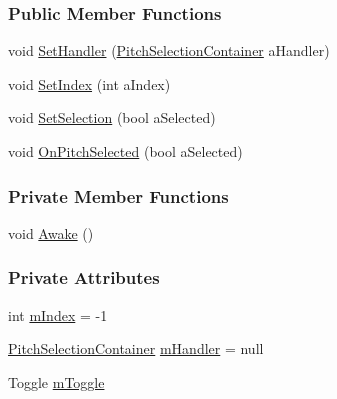 \subsubsection*{Public Member Functions}
\begin{DoxyCompactItemize}
\item 
void \hyperlink{group___s_c_handlers_ga963bc1a13bdd44643cf814aa4976f3d0}{Set\+Handler} (\hyperlink{class_song_creation_1_1_pitch_selection_container}{Pitch\+Selection\+Container} a\+Handler)
\item 
void \hyperlink{group___s_c_handlers_ga1f01d4d64cc4697b0c403c007a014afa}{Set\+Index} (int a\+Index)
\item 
void \hyperlink{group___s_c_handlers_ga0eebfa085bd5326ed4cb4981cf02d2e0}{Set\+Selection} (bool a\+Selected)
\item 
void \hyperlink{group___s_c_handlers_gac113e02950a228fc6c78ad5972238a98}{On\+Pitch\+Selected} (bool a\+Selected)
\end{DoxyCompactItemize}
\subsubsection*{Private Member Functions}
\begin{DoxyCompactItemize}
\item 
void \hyperlink{group___s_c_handlers_gae07e3c0a5aa45a8b064abb9cea88c1d6}{Awake} ()
\end{DoxyCompactItemize}
\subsubsection*{Private Attributes}
\begin{DoxyCompactItemize}
\item 
int \hyperlink{group___s_c_handlers_ga6fa7a0883292035fef62858a69044010}{m\+Index} = -\/1
\item 
\hyperlink{class_song_creation_1_1_pitch_selection_container}{Pitch\+Selection\+Container} \hyperlink{group___s_c_handlers_gaad92d071482ccc179c9a40cada09785b}{m\+Handler} = null
\item 
Toggle \hyperlink{group___s_c_handlers_gaa289269d96356379b79d3918535561fd}{m\+Toggle}
\end{DoxyCompactItemize}
\label{class_song_creation_1_1_song_creation_selection_container_1_1_song_creation_selection_trigger}
